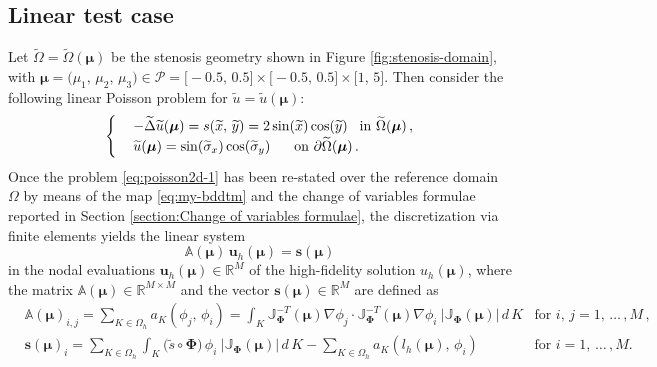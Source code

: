 \documentclass[12pt, a4paper, twoside, openright]{report}
\numberwithin{equation}{chapter}
\theoremstyle{theorem}
\theoremstyle{definition}
\theoremstyle{remark}
\theoremstyle{proposition}
\numberwithin{figure}{chapter}
\newcommand{\wt}[1]{\widetilde{#1}}
\newcommand{\bg}[1]{\boldsymbol{#1}}
\begin{document}
	\subsection{Linear test case}
	\label{section:poisson2d-1}
	
		Let $\wt{\Omega} = \wt{\Omega}(\bg{\mu})$ be the stenosis geometry shown in Figure \ref{fig:stenosis-domain}, with $\bg{\mu} = \big( \mu_1, \, \mu_2, \, \mu_3 \big) \in \mathcal{P} = \big[-0.5, \, 0.5\big] \times \big[-0.5, \, 0.5\big] \times \big[1 , \, 5\big]$. Then consider the following linear Poisson problem for $\wt{u} = \wt{u}(\bg{\mu})$:
		\begin{equation}
			\label{eq:poisson2d-1}
			\begin{cases}
				& - \wt{\Delta} \wt{u}(\bg{\mu}) = s(\wt{x}, \, \wt{y}) = 2 \sin(\wt{x}) \cos(\wt{y}) \hspace*{0.3cm} \text{in $\wt{\Omega}(\bg{\mu})$} \, , \\
				& \wt{u}(\bg{\mu}) = \sin(\wt{\sigma}_x) \cos(\wt{\sigma}_y) \hspace*{0.6cm} \text{on $\partial \wt{\Omega}(\bg{\mu})$} \, .
			\end{cases}
		\end{equation}
		Once the problem \eqref{eq:poisson2d-1} has been re-stated over the reference domain $\Omega$ by means of the map \eqref{eq:my-bddtm} and the change of variables formulae reported in Section \ref{section:Change of variables formulae}, the discretization via finite elements yields the linear system
		\begin{equation}
			\label{eq:poisson2d-1-fe-system}
			\mathbb{A}(\bg{\mu}) \, \mathbf{u}_h(\bg{\mu}) = \mathbf{s}(\bg{\mu})
		\end{equation}
		in the nodal evaluations $\mathbf{u}_h(\bg{\mu}) \in \mathbb{R}^M$ of the high-fidelity solution $u_h(\bg{\mu})$, where the matrix $\mathbb{A}(\bg{\mu}) \in \mathbb{R}^{M \times M}$ and the vector $\mathbf{s}(\bg{\mu}) \in \mathbb{R}^M$ are defined as
		\begin{equation*}
			\begin{aligned}
				& \mathbb{A}(\bg{\mu})_{i,j} = \sum_{K \in \Omega_h} a_K(\phi_j, \, \phi_i) = \int_K \mathbb{J}_{\bg{\Phi}}^{-T}(\bg{\mu}) \nabla \phi_j \cdot \mathbb{J}_{\bg{\Phi}}^{-T}(\bg{\mu}) \nabla \phi_i ~ \big| \mathbb{J}_{\bg{\Phi}}(\bg{\mu}) \big| \, d\,K & \text{for $i$, $j = 1, \, \ldots \, , M$} \, , \\
				& \mathbf{s}(\bg{\mu})_i = \sum_{K \in \Omega_h} \int_K \big( \wt{s} \circ \bg{\Phi} \big) \, \phi_i ~ \big| \mathbb{J}_{\bg{\Phi}}(\bg{\mu}) \big| \, d\,K - \sum_{K \in \Omega_h} a_K(l_h(\bg{\mu}), \, \phi_i) & \text{for $i = 1, \, \ldots \, , M$}.
			\end{aligned}
		\end{equation*}
\end{document}

